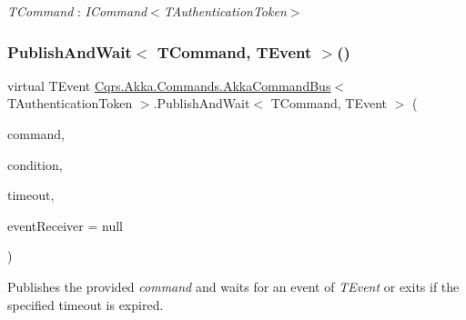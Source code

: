 \begin{Desc}
\item[Type Constraints]\begin{description}
\item[{\em T\+Command} : {\em I\+Command$<$T\+Authentication\+Token$>$}]\end{description}
\end{Desc}
\mbox{\label{classCqrs_1_1Akka_1_1Commands_1_1AkkaCommandBus_a1966669d8cf5d5a68be99fbb5e8af1f7_a1966669d8cf5d5a68be99fbb5e8af1f7}} 
\subsubsection{\texorpdfstring{Publish\+And\+Wait$<$ T\+Command, T\+Event $>$()}{PublishAndWait< TCommand, TEvent >()}\hspace{0.1cm}{\footnotesize\ttfamily [6/6]}}
{\footnotesize\ttfamily virtual T\+Event \hyperlink{classCqrs_1_1Akka_1_1Commands_1_1AkkaCommandBus}{Cqrs.\+Akka.\+Commands.\+Akka\+Command\+Bus}$<$ T\+Authentication\+Token $>$.Publish\+And\+Wait$<$ T\+Command, T\+Event $>$ (\begin{DoxyParamCaption}\item[{T\+Command}]{command,  }\item[{Func$<$ I\+Enumerable$<$ \hyperlink{interfaceCqrs_1_1Events_1_1IEvent}{I\+Event}$<$ T\+Authentication\+Token $>$$>$, T\+Event $>$}]{condition,  }\item[{Time\+Span}]{timeout,  }\item[{\hyperlink{interfaceCqrs_1_1Events_1_1IEventReceiver}{I\+Event\+Receiver}$<$ T\+Authentication\+Token $>$}]{event\+Receiver = {\ttfamily null} }\end{DoxyParamCaption})\hspace{0.3cm}{\ttfamily [virtual]}}



Publishes the provided {\itshape command}  and waits for an event of {\itshape T\+Event}  or exits if the specified timeout is expired. 


